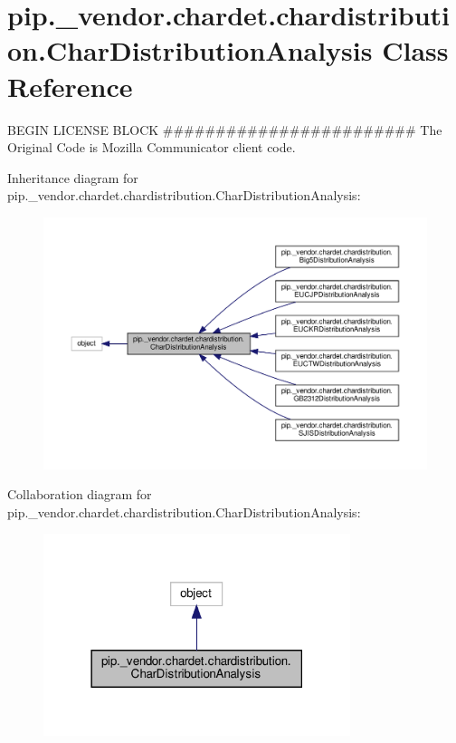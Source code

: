 \hypertarget{classpip_1_1__vendor_1_1chardet_1_1chardistribution_1_1CharDistributionAnalysis}{}\section{pip.\+\_\+vendor.\+chardet.\+chardistribution.\+Char\+Distribution\+Analysis Class Reference}
\label{classpip_1_1__vendor_1_1chardet_1_1chardistribution_1_1CharDistributionAnalysis}


B\+E\+G\+IN L\+I\+C\+E\+N\+SE B\+L\+O\+CK \#\#\#\#\#\#\#\#\#\#\#\#\#\#\#\#\#\#\#\#\#\#\#\# The Original Code is Mozilla Communicator client code.  




Inheritance diagram for pip.\+\_\+vendor.\+chardet.\+chardistribution.\+Char\+Distribution\+Analysis\+:
\nopagebreak
\begin{figure}[H]
\begin{center}
\leavevmode
\includegraphics[width=350pt]{classpip_1_1__vendor_1_1chardet_1_1chardistribution_1_1CharDistributionAnalysis__inherit__graph}
\end{center}
\end{figure}


Collaboration diagram for pip.\+\_\+vendor.\+chardet.\+chardistribution.\+Char\+Distribution\+Analysis\+:
\nopagebreak
\begin{figure}[H]
\begin{center}
\leavevmode
\includegraphics[width=254pt]{classpip_1_1__vendor_1_1chardet_1_1chardistribution_1_1CharDistributionAnalysis__coll__graph}
\end{center}
\end{figure}
